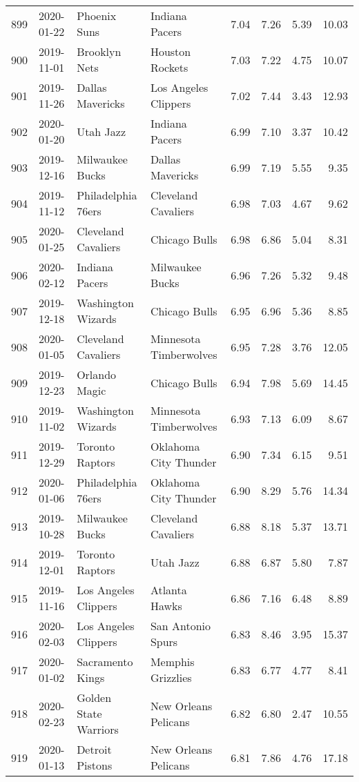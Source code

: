 \documentclass[
  11pt,
]{article}
\theoremstyle{nonumberplain}
\begin{document}
\begin{longtable}{rl|llr|rrr}
899 & 2020-01-22 & Phoenix Suns & Indiana Pacers & 7.04 & 7.26 & 5.39 & 10.03\\
900 & 2019-11-01 & Brooklyn Nets & Houston Rockets & 7.03 & 7.22 & 4.75 & 10.07\\
901 & 2019-11-26 & Dallas Mavericks & Los Angeles Clippers & 7.02 & 7.44 & 3.43 & 12.93\\
902 & 2020-01-20 & Utah Jazz & Indiana Pacers & 6.99 & 7.10 & 3.37 & 10.42\\
903 & 2019-12-16 & Milwaukee Bucks & Dallas Mavericks & 6.99 & 7.19 & 5.55 & 9.35\\
904 & 2019-11-12 & Philadelphia 76ers & Cleveland Cavaliers & 6.98 & 7.03 & 4.67 & 9.62\\
905 & 2020-01-25 & Cleveland Cavaliers & Chicago Bulls & 6.98 & 6.86 & 5.04 & 8.31\\
906 & 2020-02-12 & Indiana Pacers & Milwaukee Bucks & 6.96 & 7.26 & 5.32 & 9.48\\
907 & 2019-12-18 & Washington Wizards & Chicago Bulls & 6.95 & 6.96 & 5.36 & 8.85\\
908 & 2020-01-05 & Cleveland Cavaliers & Minnesota Timberwolves & 6.95 & 7.28 & 3.76 & 12.05\\
909 & 2019-12-23 & Orlando Magic & Chicago Bulls & 6.94 & 7.98 & 5.69 & 14.45\\
910 & 2019-11-02 & Washington Wizards & Minnesota Timberwolves & 6.93 & 7.13 & 6.09 & 8.67\\
911 & 2019-12-29 & Toronto Raptors & Oklahoma City Thunder & 6.90 & 7.34 & 6.15 & 9.51\\
912 & 2020-01-06 & Philadelphia 76ers & Oklahoma City Thunder & 6.90 & 8.29 & 5.76 & 14.34\\
913 & 2019-10-28 & Milwaukee Bucks & Cleveland Cavaliers & 6.88 & 8.18 & 5.37 & 13.71\\
914 & 2019-12-01 & Toronto Raptors & Utah Jazz & 6.88 & 6.87 & 5.80 & 7.87\\
915 & 2019-11-16 & Los Angeles Clippers & Atlanta Hawks & 6.86 & 7.16 & 6.48 & 8.89\\
916 & 2020-02-03 & Los Angeles Clippers & San Antonio Spurs & 6.83 & 8.46 & 3.95 & 15.37\\
917 & 2020-01-02 & Sacramento Kings & Memphis Grizzlies & 6.83 & 6.77 & 4.77 & 8.41\\
918 & 2020-02-23 & Golden State Warriors & New Orleans Pelicans & 6.82 & 6.80 & 2.47 & 10.55\\
919 & 2020-01-13 & Detroit Pistons & New Orleans Pelicans & 6.81 & 7.86 & 4.76 & 17.18\\

\end{longtable}
\end{document}

